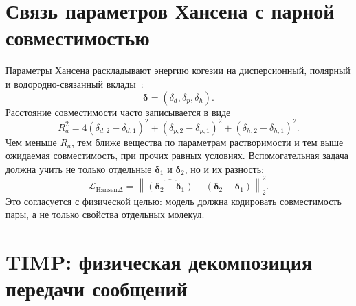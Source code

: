 \documentclass[11pt]{article}
\theoremstyle{definition}
\begin{document}
\section{Связь параметров Хансена с парной совместимостью}
\label{app:hansen}

Параметры Хансена раскладывают энергию когезии на дисперсионный, полярный и водородно-связанный вклады~\cite{hansen2007}:
\begin{equation*}
    \boldsymbol\delta
    =
    (\delta_d,\delta_p,\delta_h).
\end{equation*}
Расстояние совместимости часто записывается в виде
\begin{equation*}
    R_a^2
    =
    4(\delta_{d,2}-\delta_{d,1})^2
    +(\delta_{p,2}-\delta_{p,1})^2
    +(\delta_{h,2}-\delta_{h,1})^2.
\end{equation*}
Чем меньше $R_a$, тем ближе вещества по параметрам растворимости и тем выше ожидаемая совместимость, при прочих равных условиях. Вспомогательная задача должна учить не только отдельные $\boldsymbol\delta_1$ и $\boldsymbol\delta_2$, но и их разность:
\begin{equation*}
    \mathcal L_{\mathrm{Hansen}\Delta}
    =
    \left\|
    \widehat{(\boldsymbol\delta_2-\boldsymbol\delta_1)}
    -
    (\boldsymbol\delta_2-\boldsymbol\delta_1)
    \right\|_2^2.
\end{equation*}
Это согласуется с физической целью: модель должна кодировать совместимость пары, а не только свойства отдельных молекул.



\section{TIMP: физическая декомпозиция передачи сообщений}
\label{app:timp-math}
\end{document}
